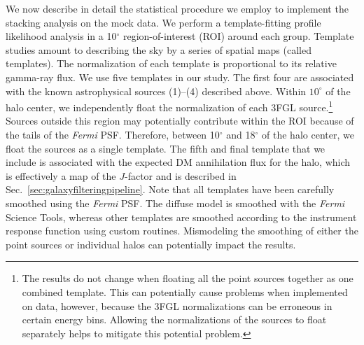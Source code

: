 We now describe in detail the statistical procedure we employ to implement the stacking analysis on the mock data.  We perform a template-fitting profile likelihood analysis in a 10$^{\circ}$ region-of-interest (ROI) around each group.  Template studies amount to describing the sky by a series of spatial maps (called templates).  The normalization of each template is proportional to its relative gamma-ray flux.  We use five templates in our study.  The first four are associated with the known astrophysical sources (1)--(4) described above. Within $10^\circ$ of the halo center, we independently float the normalization of each 3FGL source.\footnote{The results do not change when floating all the point sources together as one combined template. This can potentially cause problems when implemented on data, however, because the 3FGL normalizations can be erroneous in certain energy bins.  Allowing the normalizations of the sources to float separately helps to mitigate this potential problem.}  Sources outside this region may potentially contribute within the ROI because of the tails of the {\it Fermi} PSF.  Therefore, between 10$^{\circ}$ and 18$^{\circ}$ of the halo center,  we float the sources as a single template. The fifth and final template that we include is associated with the expected DM annihilation flux for the halo, which is effectively a map of the $J$-factor and is described in Sec.~\ref{sec:galaxyfilteringpipeline}.  Note that all templates have been carefully smoothed using the \textit{Fermi} PSF. The diffuse model is smoothed with the \textit{Fermi} Science Tools, whereas other templates are smoothed according to the instrument response function using custom routines.  Mismodeling the smoothing of either the point sources or individual halos can potentially impact the  results.

